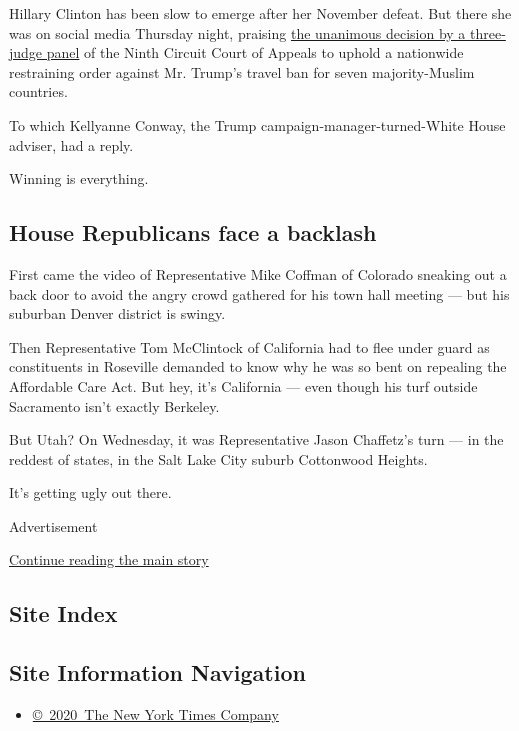 Hillary Clinton has been slow to emerge after her November defeat. But
there she was on social media Thursday night, praising
\href{https://www.nytimes.com/2017/02/09/us/politics/appeals-court-trump-travel-ban.html}{the
unanimous decision by a three-judge panel} of the Ninth Circuit Court of
Appeals to uphold a nationwide restraining order against Mr. Trump's
travel ban for seven majority-Muslim countries.

To which Kellyanne Conway, the Trump campaign-manager-turned-White House
adviser, had a reply.

Winning is everything.

\hypertarget{house-republicans-face-a-backlash}{%
\subsection{House Republicans face a
backlash}\label{house-republicans-face-a-backlash}}

First came the video of Representative Mike Coffman of Colorado sneaking
out a back door to avoid the angry crowd gathered for his town hall
meeting --- but his suburban Denver district is swingy.

Then Representative Tom McClintock of California had to flee under guard
as constituents in Roseville demanded to know why he was so bent on
repealing the Affordable Care Act. But hey, it's California --- even
though his turf outside Sacramento isn't exactly Berkeley.

But Utah? On Wednesday, it was Representative Jason Chaffetz's turn ---
in the reddest of states, in the Salt Lake City suburb Cottonwood
Heights.

It's getting ugly out there.

Advertisement

\protect\hyperlink{after-bottom}{Continue reading the main story}

\hypertarget{site-index}{%
\subsection{Site Index}\label{site-index}}

\hypertarget{site-information-navigation}{%
\subsection{Site Information
Navigation}\label{site-information-navigation}}

\begin{itemize}
\tightlist
\item
  \href{https://help.nytimes.com/hc/en-us/articles/115014792127-Copyright-notice}{©~2020~The
  New York Times Company}
\end{itemize}


